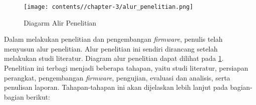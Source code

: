 \begin{figure}[ht]
    \centering
    \texttt{[image: contents//chapter-3/alur\_penelitian.png]}
    \caption{Diagarm Alir Penelitian}
    \label{fig:alur_penelitian}
\end{figure}

Dalam melakukan penelitian dan pengembangan \textit{firmware}, penulis telah menyusun alur penelitian. Alur penelitian ini sendiri dirancang setelah melakukan studi literatur. Diagram alur penelitian dapat dilihat pada \ref{fig:alur_penelitian}. Penelitian ini terbagi menjadi beberapa tahapan, yaitu studi literatur, persiapan perangkat, pengembangan \textit{firmware}, pengujian, evaluasi dan analisis, serta penulisan laporan. Tahapan-tahapan ini akan dijelaskan lebih lanjut pada bagian-bagian berikut:


